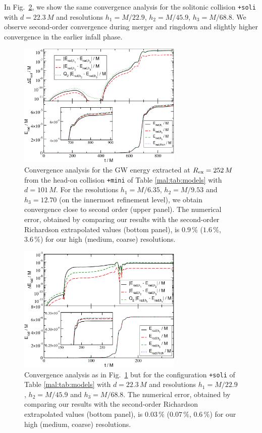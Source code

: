 In Fig.~\ref{mal:fig:conv_tsBS_Erad}, we show the same
convergence analysis for the solitonic collision
{\tt +soli} with $d=22.3\,M$ and resolutions
$h_1=M/22.9$, $h_2=M/45.9$, $h_3=M/68.8$. We observe
second-order convergence during merger and ringdown and
slightly higher convergence in the earlier infall phase.
%
\begin{figure}[t]
    \centering
    \includegraphics[width=0.7\textwidth]{malaise_source/conv_tmBS_Erad.pdf}
    \caption{
    Convergence analysis for the GW energy extracted at
    $R_{\rm ex}=252\,M$ from the head-on collision
    {\tt +mini} of Table \ref{mal:tab:models} with
    $d=101\,M$. For the resolutions
    $h_1=M/6.35$, $h_2=M/9.53$ and $h_3=12.70$
    (on the innermost refinement level),
    we obtain convergence close to second order
    (upper panel). The numerical error,
    obtained by comparing our results
    with the second-order Richardson extrapolated values
    (bottom panel), is $0.9\,\%$ ($1.6\,\%$, $3.6\,\%$) for
    our high (medium, coarse) resolutions.
    }
    \label{mal:fig:conv_tmBS_Erad}
\end{figure}
%
%
\begin{figure}[t]
    \centering
    \includegraphics[width=0.7\textwidth]{malaise_source/conv_tsBS_Erad.pdf}
    \caption{Convergence analysis as in
    Fig.~\ref{mal:fig:conv_tmBS_Erad} but for the configuration
    {\tt +soli} of Table \ref{mal:tab:models} with
    $d=22.3\,M$ and
    resolutions $h_1=M/22.9$, $h_2=M/45.9$ and $h_3=M/68.8$.
    The numerical error,
    obtained by comparing our results
    with the second-order Richardson extrapolated values
    (bottom panel),
    is $0.03\,\%$ ($0.07\,\%$, $0.6\,\%$) for
    our high (medium, coarse) resolutions.
    }
    \label{mal:fig:conv_tsBS_Erad}
\end{figure}
